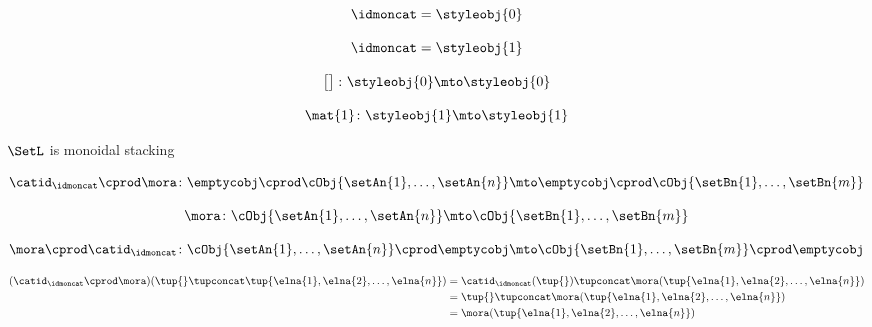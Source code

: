{\begin{forslides}
    \begin{equation}
        \label{eq:parallelism-062}
        \idmoncat = \styleobj{0}
    \end{equation}

    \begin{equation}
        \label{eq:parallelism-063}
        \idmoncat = \styleobj{1}
    \end{equation}

    \begin{equation}
        \label{eq:parallelism-064}
        \begin{bmatrix}\\ \end{bmatrix} \colon \styleobj{0} \mto \styleobj{0}
    \end{equation}

    \begin{equation}
        \label{eq:parallelism-065}
        \mat{ 1 } \colon \styleobj{1} \mto \styleobj{1}
    \end{equation}

    $\SetL$ is monoidal stacking

    \begin{equation}
        \label{eq:parallelism-066}
        \catid_\idmoncat \cprod \mora \colon \emptycobj \cprod \cObj{\setAn{1}, \ldots, \setAn{n}} \mto \emptycobj \cprod \cObj{\setBn{1}, \ldots, \setBn{m}}
    \end{equation}

    \begin{equation}
        \label{eq:parallelism-067}
        \mora \colon \cObj{\setAn{1}, \ldots, \setAn{n}} \mto \cObj{\setBn{1}, \ldots, \setBn{m}}
    \end{equation}

    \begin{equation}
        \label{eq:parallelism-068}
        \mora \cprod \catid_\idmoncat \colon \cObj{\setAn{1}, \ldots, \setAn{n}} \cprod \emptycobj \mto \cObj{\setBn{1}, \ldots, \setBn{m}} \cprod \emptycobj
    \end{equation}

    \begin{align*}
        \label{eq:parallelism-069}
        (\catid_\idmoncat \cprod \mora) (\tup{} \tupconcat \tup{\elna{1}, \elna{2}, \ldots, \elna{n}}) & = \catid_\idmoncat (\tup{}) \tupconcat \mora(\tup{\elna{1}, \elna{2}, \ldots, \elna{n}}) \\ &= \tup{} \tupconcat \mora(\tup{\elna{1}, \elna{2}, \ldots, \elna{n}}) \\
                                                                                                       & = \mora(\tup{\elna{1}, \elna{2}, \ldots, \elna{n}})
    \end{align*}


\end{forslides}}
